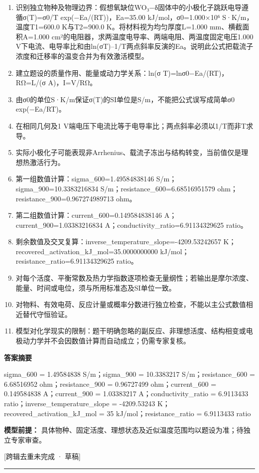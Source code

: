 \documentclass[UTF8,11pt,a4paper]{ctexart}
\begin{document}
\begin{enumerate}
\item 识别独立物种及物理边界：假想氧缺位WO₃−δ固体中的小极化子跳跃电导遵循σ(T)=σ0/T exp(−Ea/(RT))，Ea=35.00 kJ/mol，σ0=1.000×10⁶ S·K/m，温度T1=600.0 K与T2=900.0 K。将材料视为均匀厚度L=1.000 mm、横截面积A=1.000 cm²的电阻器，求两温度电导率、两端电阻、两温度固定电压1.000 V下电流、电导率比和由ln(σT)–1/T两点斜率反演的Ea。说明此公式把载流子浓度和迁移率的温变合并为有效激活模型。
\item 建立题设的质量作用、能量或动力学关系：ln(σ T)=lnσ0−Ea/(RT)，RΩ=L/(σ A)，I=V/RΩ。
\item 由σ0的单位S·K/m保证σ(T)的SI单位是S/m，不能把公式误写成简单σ0 exp(−Ea/RT)。
\item 在相同几何及1 V端电压下电流比等于电导率比；两点斜率必须以1/T而非T求导。
\item 实际小极化子可能表现非Arrhenius、载流子冻出与结构转变，当前值仅是理想热激活行为。
\item 第一组数值计算：sigma\_600=1.49584838146 S/m；sigma\_900=10.3383216834 S/m；resistance\_600=6.68516951579 ohm；resistance\_900=0.967274989713 ohm。
\item 第二组数值计算：current\_600=0.149584838146 A；current\_900=1.03383216834 A；conductivity\_ratio=6.91134329625 ratio。
\item 剩余数值及交叉复算：inverse\_temperature\_slope=-4209.53242657 K；recovered\_activation\_kJ\_mol=35.0000000000 kJ/mol；resistance\_ratio=6.91134329625 ratio。
\item 对每个活度、平衡常数及热力学指数逐项检查无量纲性；若输出是摩尔浓度、能量、时间或电位，须与所用标准态及SI单位一致。
\item 对物料、有效电荷、反应计量或概率分数进行独立检查，不能以主公式数值相近替代守恒验证。
\item 模型对化学现实的限制：题干明确忽略的副反应、非理想活度、结构相变或电极动力学并不会因数值计算而自动成立；仍需专家复核。
\end{enumerate}
\noindent\textbf{答案摘要}\par
sigma\_600 = 1.49584838 S/m；sigma\_900 = 10.3383217 S/m；resistance\_600 = 6.68516952 ohm；resistance\_900 = 0.96727499 ohm；current\_600 = 0.149584838 A；current\_900 = 1.03383217 A；conductivity\_ratio = 6.9113433 ratio；inverse\_temperature\_slope = -4209.53243 K；recovered\_activation\_kJ\_mol = 35 kJ/mol；resistance\_ratio = 6.9113433 ratio\par
\noindent\textbf{模型前提：}
具体物种、固定活度、理想状态及近似温度范围均以题设为准；待独立专家审查。\par
\noindent\textcolor{red!65!black}{[跨辑去重未完成 · 草稿]} \par
\medskip\hrule\medskip
{}
\end{document}
